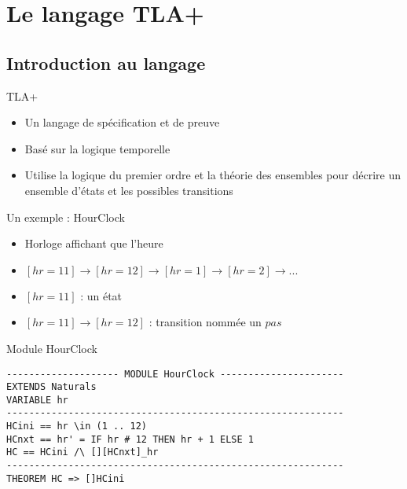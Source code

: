 \documentclass{beamer}
\begin{document}
\section{Le langage TLA+}

\subsection{Introduction au langage}

\begin{frame}
	\begin{block}{TLA+}
		\begin{itemize}
			\item Un langage de spécification et de preuve
			\item Basé sur la logique temporelle
			\item Utilise la logique du premier ordre et la théorie des ensembles pour décrire un ensemble d'états et les possibles transitions
		\end{itemize}
	\end{block}
	\begin{block}{Un exemple : HourClock}
		\begin{itemize}
			\item Horloge affichant que l'heure
			\item $ [hr = 11] \rightarrow [hr = 12] \rightarrow [hr = 1] \rightarrow [hr = 2] \rightarrow ...$
			\item $[hr = 11]$ : un état
			\item $[hr = 11] \rightarrow [hr = 12]$ : transition nommée un $pas$
		\end{itemize}
	\end{block}
\end{frame}

\begin{frame}[containsverbatim]{Module HourClock}
\begin{lstlisting}[frame=single, basicstyle=\scriptsize]
-------------------- MODULE HourClock ----------------------
EXTENDS Naturals
VARIABLE hr
------------------------------------------------------------
HCini == hr \in (1 .. 12)
HCnxt == hr' = IF hr # 12 THEN hr + 1 ELSE 1
HC == HCini /\ [][HCnxt]_hr
------------------------------------------------------------
THEOREM HC => []HCini

\end{lstlisting}
\end{frame}
\end{document}
